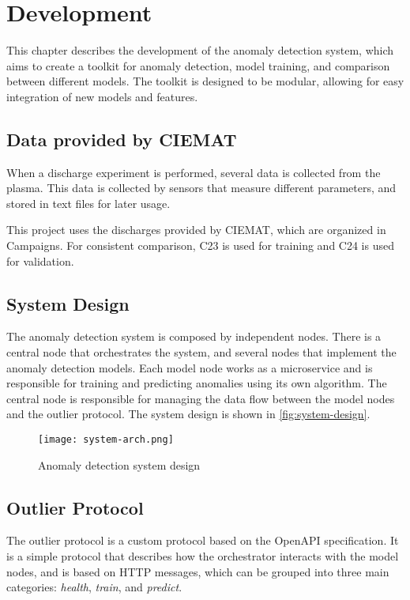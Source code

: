 \chapter{Development}\label{sec:cap3}

This chapter describes the development of the anomaly detection system, which aims to create a toolkit for anomaly detection, model training, and comparison between different models. The toolkit is designed to be modular, allowing for easy integration of new models and features.

\section{Data provided by \acs{CIEMAT}}

When a discharge experiment is performed, several data is collected from the plasma. This data is collected by sensors that measure different parameters, and stored in text files for later usage.



This project uses the discharges provided by \ac{CIEMAT}, which are organized in Campaigns. For consistent comparison, C23 is used for training and C24 is used for validation.


\section{System Design}

The anomaly detection system is composed by independent nodes. There is a central node that orchestrates the system, and several nodes that implement the anomaly detection models. Each model node works as a microservice and is responsible for training and predicting anomalies using its own algorithm. The central node is responsible for managing the data flow between the model nodes and the outlier protocol. The system design is shown in \autoref{fig:system-design}.

\begin{figure}[H]
    \centering
    \texttt{[image: system-arch.png]}
    \caption{Anomaly detection system design}
    \label{fig:system-design}
\end{figure}

\section{Outlier Protocol}

The outlier protocol is a custom protocol based on the OpenAPI specification. It is a simple protocol that describes how the orchestrator interacts with the model nodes, and is based on HTTP messages, which can be grouped into three main categories: \textit{health}, \textit{train}, and \textit{predict}.

